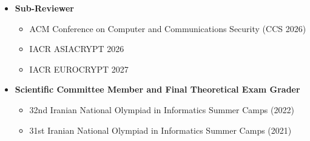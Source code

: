 \documentclass[letterpaper,11pt]{article}
\begin{document}
{\small
\begin{itemize}[leftmargin=1.2em, itemsep=1pt, topsep=2pt]
    \item \textbf{Sub-Reviewer}
    \begin{itemize}[leftmargin=1.5em, label=$\circ$, itemsep=0pt, topsep=0pt]
        \item ACM Conference on Computer and Communications Security (CCS 2026)
        \item IACR ASIACRYPT 2026
        \item IACR EUROCRYPT 2027
    \end{itemize}

    \item \textbf{Scientific Committee Member and Final Theoretical Exam Grader}
    \begin{itemize}[leftmargin=1.5em, label=$\circ$, itemsep=0pt, topsep=0pt]
        \item 32nd Iranian National Olympiad in Informatics Summer Camps (2022)
        \item 31st Iranian National Olympiad in Informatics Summer Camps (2021)
    \end{itemize}
\end{itemize}
}
\vspace{-10pt}


\noindent
\end{document}

